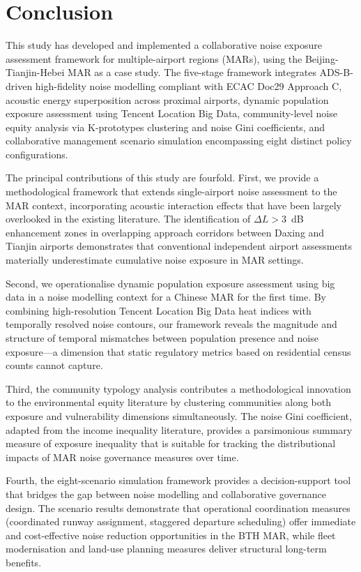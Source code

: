 \documentclass[review,12pt]{elsarticle}
\begin{document}
\section{Conclusion}
\label{sec:conclusion}

This study has developed and implemented a collaborative noise exposure assessment framework for multiple-airport regions (MARs), using the Beijing-Tianjin-Hebei MAR as a case study. The five-stage framework integrates ADS-B-driven high-fidelity noise modelling compliant with ECAC Doc29 Approach C, acoustic energy superposition across proximal airports, dynamic population exposure assessment using Tencent Location Big Data, community-level noise equity analysis via K-prototypes clustering and noise Gini coefficients, and collaborative management scenario simulation encompassing eight distinct policy configurations.

The principal contributions of this study are fourfold. First, we provide a methodological framework that extends single-airport noise assessment to the MAR context, incorporating acoustic interaction effects that have been largely overlooked in the existing literature. The identification of $\Delta L > 3$~dB enhancement zones in overlapping approach corridors between Daxing and Tianjin airports demonstrates that conventional independent airport assessments materially underestimate cumulative noise exposure in MAR settings.

Second, we operationalise dynamic population exposure assessment using big data in a noise modelling context for a Chinese MAR for the first time. By combining high-resolution Tencent Location Big Data heat indices with temporally resolved noise contours, our framework reveals the magnitude and structure of temporal mismatches between population presence and noise exposure---a dimension that static regulatory metrics based on residential census counts cannot capture.

Third, the community typology analysis contributes a methodological innovation to the environmental equity literature by clustering communities along both exposure and vulnerability dimensions simultaneously. The noise Gini coefficient, adapted from the income inequality literature, provides a parsimonious summary measure of exposure inequality that is suitable for tracking the distributional impacts of MAR noise governance measures over time.

Fourth, the eight-scenario simulation framework provides a decision-support tool that bridges the gap between noise modelling and collaborative governance design. The scenario results demonstrate that operational coordination measures (coordinated runway assignment, staggered departure scheduling) offer immediate and cost-effective noise reduction opportunities in the BTH MAR, while fleet modernisation and land-use planning measures deliver structural long-term benefits.
\end{document}
